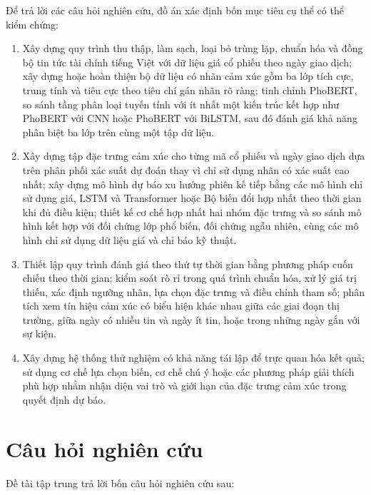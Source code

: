 \documentclass[12pt, a4paper, oneside]{report}
\begin{document}
Để trả lời các câu hỏi nghiên cứu, đồ án xác định bốn mục tiêu cụ thể có thể kiểm chứng:

\begin{enumerate}[nosep]
  \item Xây dựng quy trình thu thập, làm sạch, loại bỏ trùng lặp,
    chuẩn hóa và đồng bộ tin tức tài chính tiếng Việt với dữ liệu giá cổ phiếu theo ngày
    giao dịch; xây dựng hoặc hoàn thiện bộ dữ liệu có nhãn cảm xúc gồm ba lớp tích cực,
    trung tính và tiêu cực theo tiêu chí gán nhãn rõ ràng; tinh chỉnh PhoBERT, so sánh tầng phân loại
    tuyến tính với ít nhất một kiến trúc kết hợp như PhoBERT với CNN hoặc PhoBERT với
    BiLSTM, sau đó đánh giá khả năng phân biệt ba lớp trên cùng một tập dữ liệu.
  \item Xây dựng tập đặc trưng cảm xúc cho từng mã cổ phiếu và ngày
    giao dịch dựa trên phân phối xác suất dự đoán thay vì chỉ sử dụng nhãn có xác suất cao nhất;
    xây dựng mô hình dự báo xu hướng phiên kế tiếp bằng các mô hình chỉ sử dụng giá, LSTM
    và Transformer hoặc Bộ biến đổi hợp nhất theo thời gian khi đủ điều kiện; thiết kế cơ chế hợp
    nhất hai nhóm đặc trưng và so sánh mô hình kết hợp với đối chứng lớp phổ biến, đối chứng ngẫu nhiên, cùng các mô
    hình chỉ sử dụng dữ liệu giá và chỉ báo kỹ thuật.
  \item Thiết lập quy trình đánh giá theo thứ tự thời gian bằng phương pháp cuốn chiếu theo thời
    gian; kiểm soát rò rỉ trong quá trình chuẩn hóa, xử lý giá trị thiếu, xác định ngưỡng nhãn,
    lựa chọn đặc trưng và điều chỉnh tham số; phân tích xem tín hiệu cảm xúc có biểu hiện khác nhau
    giữa các giai đoạn thị trường, giữa ngày có nhiều tin và ngày ít tin, hoặc
    trong những ngày gắn với sự kiện.
  \item Xây dựng hệ thống thử nghiệm có khả năng tái lập để trực quan hóa
    kết quả; sử dụng cơ chế lựa chọn biến, cơ chế chú ý hoặc các phương pháp giải thích phù
    hợp nhằm nhận diện vai trò và giới hạn của đặc trưng cảm xúc trong quyết định dự
    báo.
\end{enumerate}
\section{Câu hỏi nghiên cứu}

Đề tài tập trung trả lời bốn câu hỏi nghiên cứu sau:
\end{document}
